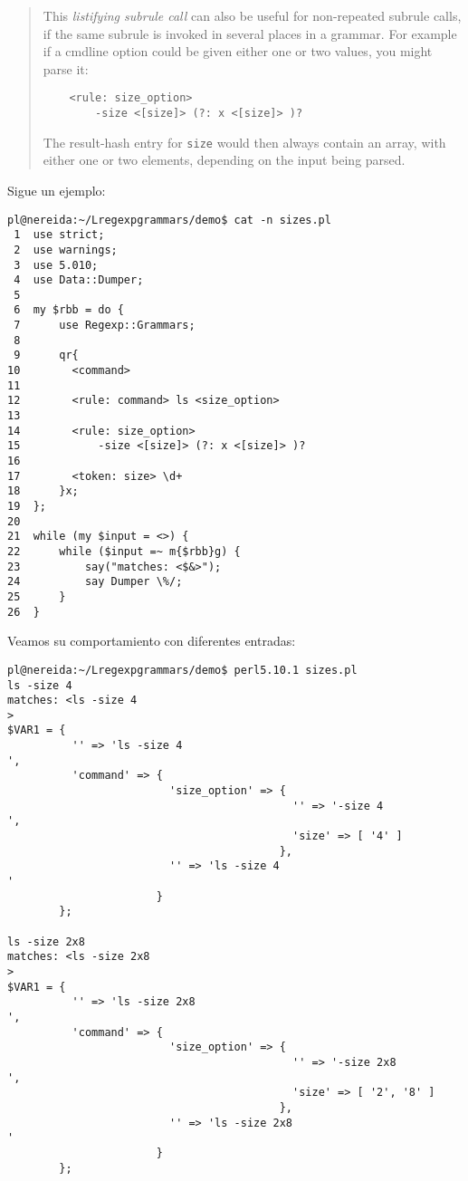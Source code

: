 \begin{it}\begin{quotation}
This \emph{listifying subrule call} can also be useful for non-repeated
subrule calls, if the same subrule is invoked in several places in a
grammar. For example if a cmdline option could be given either one or
two values, you might parse it:

\begin{verbatim}
    <rule: size_option>   
        -size <[size]> (?: x <[size]> )?
\end{verbatim}

The result-hash entry for \verb'size' would then always contain an array,
with either one or two elements, depending on the input being parsed.
\end{quotation}\end{it}
Sigue un ejemplo:
\begin{verbatim}
pl@nereida:~/Lregexpgrammars/demo$ cat -n sizes.pl
 1  use strict;
 2  use warnings;
 3  use 5.010;
 4  use Data::Dumper;
 5
 6  my $rbb = do {
 7      use Regexp::Grammars;
 8
 9      qr{
10        <command>
11
12        <rule: command> ls <size_option>
13
14        <rule: size_option>
15            -size <[size]> (?: x <[size]> )?
16
17        <token: size> \d+
18      }x;
19  };
20
21  while (my $input = <>) {
22      while ($input =~ m{$rbb}g) {
23          say("matches: <$&>");
24          say Dumper \%/;
25      }
26  }
\end{verbatim}
Veamos su comportamiento con diferentes entradas:
\begin{verbatim}
pl@nereida:~/Lregexpgrammars/demo$ perl5.10.1 sizes.pl
ls -size 4
matches: <ls -size 4
>
$VAR1 = {
          '' => 'ls -size 4
',
          'command' => {
                         'size_option' => {
                                            '' => '-size 4
',
                                            'size' => [ '4' ]
                                          },
                         '' => 'ls -size 4
'
                       }
        };

ls -size 2x8
matches: <ls -size 2x8
>
$VAR1 = {
          '' => 'ls -size 2x8
',
          'command' => {
                         'size_option' => {
                                            '' => '-size 2x8
',
                                            'size' => [ '2', '8' ]
                                          },
                         '' => 'ls -size 2x8
'
                       }
        };
\end{verbatim}

